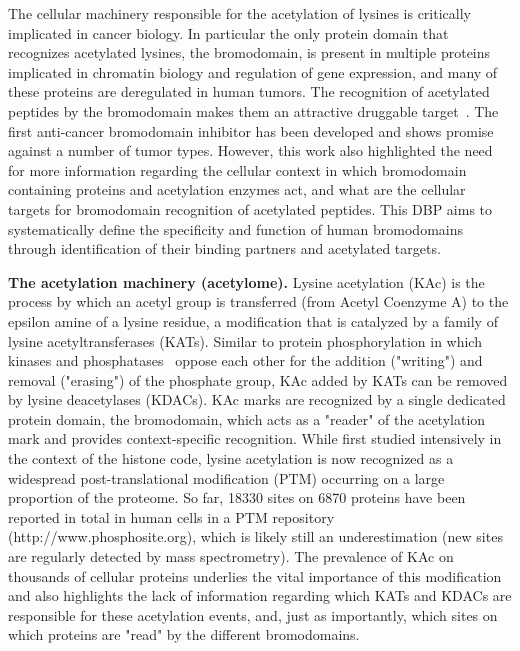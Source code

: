 \documentclass[arial,11pt]{article}
\begin{document}
The cellular machinery responsible for the acetylation of lysines is critically implicated in cancer biology. In particular the only protein domain that recognizes acetylated lysines, the bromodomain, is present in multiple proteins implicated in chromatin biology and regulation of gene expression, and many of these proteins are deregulated in human tumors. The recognition of acetylated peptides by the bromodomain makes them an attractive druggable target~\cite{filippakopoulos12}.
The first anti-cancer bromodomain inhibitor
has been developed and shows promise against a number of tumor types. However, this work also highlighted the need for more information regarding the cellular context in which bromodomain containing proteins and acetylation enzymes act, and what are the cellular targets for bromodomain recognition of acetylated peptides. This DBP aims to systematically define the specificity and function of human bromodomains through identification of their binding partners and acetylated targets.

{\bf The acetylation machinery (acetylome).} Lysine acetylation (KAc) is the process by which an acetyl group is transferred (from Acetyl Coenzyme A) to the epsilon amine of a lysine residue, a modification that is catalyzed by a family of lysine acetyltransferases (KATs). Similar to protein phosphorylation in which kinases and phosphatases~\cite{breitkreutz10} oppose each other for the addition ("writing") and removal ("erasing") of the phosphate group, KAc added by KATs can be removed by lysine deacetylases (KDACs). KAc marks are recognized by a single dedicated protein domain, the bromodomain, which acts as a "reader" of the acetylation mark and provides context-specific recognition.
While first studied intensively in the context of the histone code, lysine acetylation is now recognized as a widespread post-translational modification (PTM) occurring on a large proportion of the proteome. So far, 18330 sites on 6870 proteins have been reported in total in human cells in a PTM repository (http://www.phosphosite.org), which is likely still an underestimation (new sites are regularly detected by mass spectrometry). The prevalence of KAc on thousands of cellular proteins underlies the vital importance of this modification and also highlights the lack of information regarding which KATs and KDACs are responsible for these acetylation events, and, just as importantly, which sites on which proteins are "read" by the different bromodomains.
\end{document}
